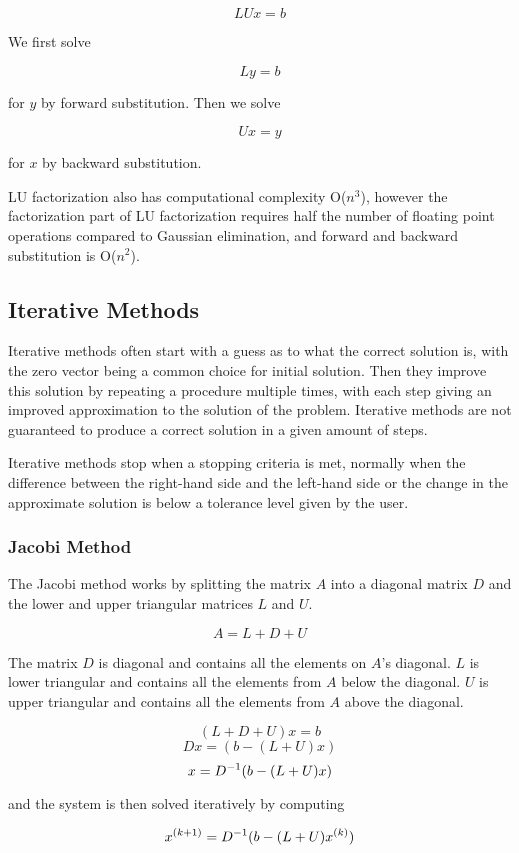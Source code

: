 $$LUx = b$$

We first solve 

$$Ly = b$$

for $y$ by forward substitution. Then we solve 

$$Ux = y$$

for $x$ by backward substitution.

LU factorization also has computational complexity O($n^3$), however the factorization part of 
LU factorization requires half the number of floating point operations compared to Gaussian elimination, 
and forward and backward substitution is O($n^2$)\cite{Kreyszig}.

\subsection{Iterative Methods}

Iterative methods often start with a guess as to what the correct solution is, 
with the zero vector being a common choice for initial solution. Then they improve 
this solution by repeating a procedure multiple times, with each step 
giving an improved approximation to the solution of the problem. Iterative methods 
are not guaranteed to produce a correct solution in a given amount of steps. 

Iterative methods stop when a stopping criteria is met, normally when the difference 
between the right-hand side and the left-hand side or the change in the approximate 
solution is below a tolerance level given by the user. 

\subsubsection{Jacobi Method}

The Jacobi method works by splitting the matrix $A$ into a diagonal matrix $D$ 
and the lower and upper triangular matrices $L$ and $U$. 

$$A = L+D+U$$

The matrix $D$ is diagonal and contains all the elements on $A$'s diagonal. $L$ 
is lower triangular and contains all the elements from $A$ below the diagonal. 
$U$ is upper triangular and contains all the elements from $A$ above the diagonal.

$$(L+D+U)x = b$$
$$Dx = (b - (L+U)x)$$
$$x = {D}^{-1}(b - (L+U)x)$$

and the system is then solved iteratively by computing 

$$x^{(k+1)} = {D}^{-1}(b - (L+U)x^{(k)})$$

